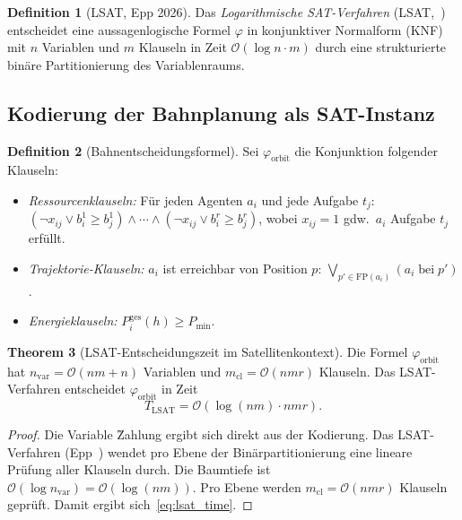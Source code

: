 ﻿\documentclass[a4paper,12pt]{article}
\theoremstyle{definition}
\newtheorem{definition}{Definition}[section]
\newtheorem{theorem}[definition]{Theorem}
\begin{document}
\begin{definition}[LSAT, Epp 2026]
Das \emph{Logarithmische SAT-Verfahren} (LSAT,~\cite{Epp2026lsat}) entscheidet
eine aussagenlogische Formel $\varphi$ in konjunktiver Normalform (KNF)
mit $n$ Variablen und $m$ Klauseln in Zeit
$\mathcal{O}(\log n \cdot m)$
durch eine strukturierte bin\"are Partitionierung des Variablenraums.
\end{definition}

\subsection{Kodierung der Bahnplanung als SAT-Instanz}

\begin{definition}[Bahnentscheidungsformel]
Sei $\varphi_{\mathrm{orbit}}$ die Konjunktion folgender Klauseln:
\begin{itemize}
  \item \emph{Ressourcenklauseln:} F\"ur jeden Agenten $a_i$ und jede Aufgabe $t_j$:
    $(\neg x_{ij} \vee b_i^1 \geq b_j^1) \wedge \cdots \wedge
    (\neg x_{ij} \vee b_i^r \geq b_j^r)$,
    wobei $x_{ij} = 1$ gdw.\ $a_i$ Aufgabe $t_j$ erf\"ullt.
  \item \emph{Trajektorie-Klauseln:} $a_i$ ist erreichbar von Position $p$:
    $\bigvee_{p' \in \mathrm{FP}(a_i)} (a_i\;\text{bei}\;p')$.
  \item \emph{Energieklauseln:} $P_i^{\mathrm{ges}}(h) \geq P_{\min}$.
\end{itemize}
\end{definition}

\begin{theorem}[LSAT-Entscheidungszeit im Satellitenkontext]
\label{thm:lsat_time}
Die Formel $\varphi_{\mathrm{orbit}}$ hat $n_{\mathrm{var}} = \mathcal{O}(nm + n)$
Variablen und $m_{\mathrm{cl}} = \mathcal{O}(nmr)$ Klauseln.
Das LSAT-Verfahren entscheidet $\varphi_{\mathrm{orbit}}$ in Zeit
\begin{equation}
  T_{\mathrm{LSAT}} = \mathcal{O}(\log(nm) \cdot nmr).
  \label{eq:lsat_time}
\end{equation}
\end{theorem}

\begin{proof}
Die Variable \"Zahlung ergibt sich direkt aus der Kodierung.
Das LSAT-Verfahren (Epp~\cite{Epp2026lsat}) wendet pro Ebene der
Bin\"arpartitionierung eine lineare Pr\"ufung aller Klauseln durch.
Die Baumtiefe ist $\mathcal{O}(\log n_{\mathrm{var}}) = \mathcal{O}(\log(nm))$.
Pro Ebene werden $m_{\mathrm{cl}} = \mathcal{O}(nmr)$ Klauseln gepr\"uft.
Damit ergibt sich~\eqref{eq:lsat_time}.
\end{proof}
\end{document}
